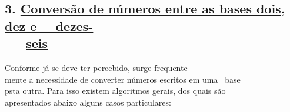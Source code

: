 \documentclass[a4paper,12pt]{article}
\begin{document}
\subsection*{3. \uline{Conversão de números entre as bases dois, dez e \ \ dezes-}\\
\phantom \ \ \ \uline{seis}}

Conforme já se deve ter percebido, surge frequente -\\
mente a necessidade de converter números escritos em uma \ base\\
psta outra. Para isso existem algoritmos gerais, dos quais são\\
apresentados abaixo alguns casos particulares:
\end{document}
